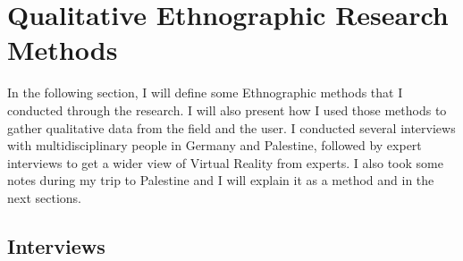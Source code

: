 \section{Qualitative Ethnographic Research Methods}

In the following section, I will define some Ethnographic methods that I conducted through the research. I will also present how I used those methods to gather qualitative data from the field and the user. I conducted several interviews with multidisciplinary people in Germany and Palestine, followed by expert interviews to get a wider view of Virtual Reality from experts. I also took some notes during my trip to Palestine and I will explain it as a method and in the next sections.        

\subsection{Interviews}

